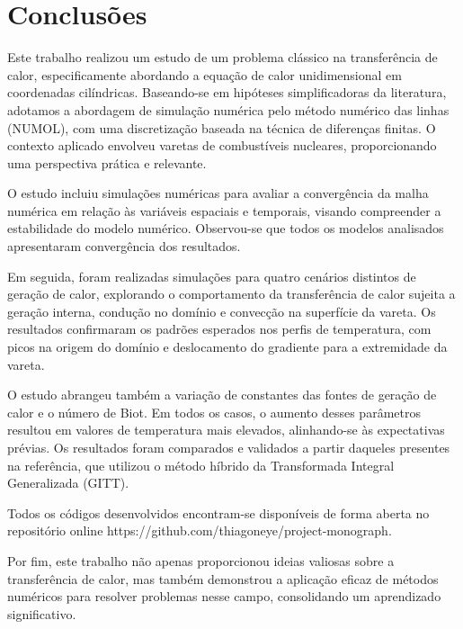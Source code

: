 \chapter{Conclusões} \label{chap:conclusion}

Este trabalho realizou um estudo de um problema clássico na transferência de calor, especificamente abordando a equação de calor unidimensional em coordenadas cilíndricas. Baseando-se em hipóteses simplificadoras da literatura, adotamos a abordagem de simulação numérica pelo método numérico das linhas (NUMOL), com uma discretização baseada na técnica de diferenças finitas. O contexto aplicado envolveu varetas de combustíveis nucleares, proporcionando uma perspectiva prática e relevante.

O estudo incluiu simulações numéricas para avaliar a convergência da malha numérica em relação às variáveis espaciais e temporais, visando compreender a estabilidade do modelo numérico. Observou-se que todos os modelos analisados apresentaram convergência dos resultados.

Em seguida, foram realizadas simulações para quatro cenários distintos de geração de calor, explorando o comportamento da transferência de calor sujeita a geração interna, condução no domínio e convecção na superfície da vareta. Os resultados confirmaram os padrões esperados nos perfis de temperatura, com picos na origem do domínio e deslocamento do gradiente para a extremidade da vareta.

O estudo abrangeu também a variação de constantes das fontes de geração de calor e o número de Biot. Em todos os casos, o aumento desses parâmetros resultou em valores de temperatura mais elevados, alinhando-se às expectativas prévias. Os resultados foram comparados e validados a partir daqueles presentes na referência, que utilizou o método híbrido da Transformada Integral Generalizada (GITT).

Todos os códigos desenvolvidos encontram-se disponíveis de forma aberta no repositório online https://github.com/thiagoneye/project-monograph.

Por fim, este trabalho não apenas proporcionou ideias valiosas sobre a transferência de calor, mas também demonstrou a aplicação eficaz de métodos numéricos para resolver problemas nesse campo, consolidando um aprendizado significativo.